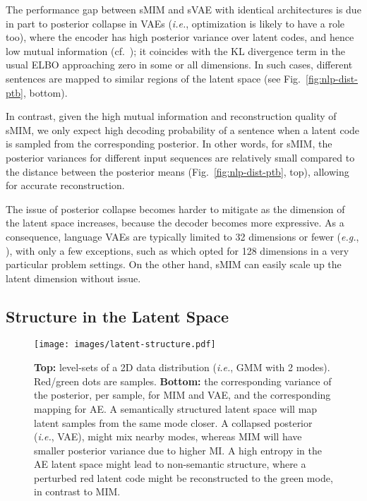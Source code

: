 \documentclass{article}
\newcommand{\eg}{{\em e.g.}}
\newcommand{\ie}{{\em i.e.}}
\begin{document}
The performance gap between sMIM and sVAE  with identical architectures is due in part to posterior collapse in VAEs 
(\ie, optimization is likely to have a role too), 
where the encoder has high posterior variance over latent codes, and hence low mutual information
(cf.\ \citep{Zhao_Song_Ermon_2018,DBLP:journals/corr/abs-1711-00464}); it coincides with the KL divergence term in the 
usual ELBO approaching zero in some or all dimensions. 
In such cases, different sentences are mapped to similar regions of the latent space (see Fig.\ \ref{fig:nlp-dist-ptb}, bottom).

In contrast, given the high mutual information and reconstruction quality of sMIM, 
we only expect high decoding probability of a sentence when a latent code is sampled from
the corresponding posterior.
In other words, for sMIM, the posterior variances for different input sequences
are relatively small compared
to the distance between the posterior means (Fig.\ \ref{fig:nlp-dist-ptb}, top),
allowing for accurate reconstruction.



The issue of posterior collapse becomes harder to mitigate as the dimension of the latent space increases, because the decoder becomes more expressive.
As a consequence, language VAEs are typically limited to 32 dimensions or fewer (\eg, \citet{he2018lagging}), with only a few exceptions, such as \citet{Guu2017GeneratingSB} which opted for 128 dimensions in a very particular problem settings.  
On the other hand, sMIM can easily scale up the latent dimension without issue.

\subsection{Structure in the Latent Space} \label{sec:nlp-mim-vs-ae}

\begin{figure}[t]
    \vspace*{0.1cm}
    \centering
        \texttt{[image: images/latent-structure.pdf]}
        \vspace*{-0.8cm}
    \caption{
    \textbf{Top:} level-sets of a 2D data distribution (\ie, GMM with 2 modes).
    Red/green dots are samples.
    \textbf{Bottom:} the corresponding variance of the posterior, per sample, 
    for MIM and VAE, and the corresponding mapping for AE. 
    A semantically structured latent space will map latent samples from the same mode closer. A collapsed posterior (\ie, VAE), might mix nearby modes, 
    whereas MIM will have smaller posterior variance due to higher MI.
    A high entropy in the AE latent space might lead to non-semantic structure, where a perturbed red latent code might be reconstructed to the green mode, in contrast to MIM.
    \label{fig:latent-structure}
    }
\end{figure}
\end{document}
